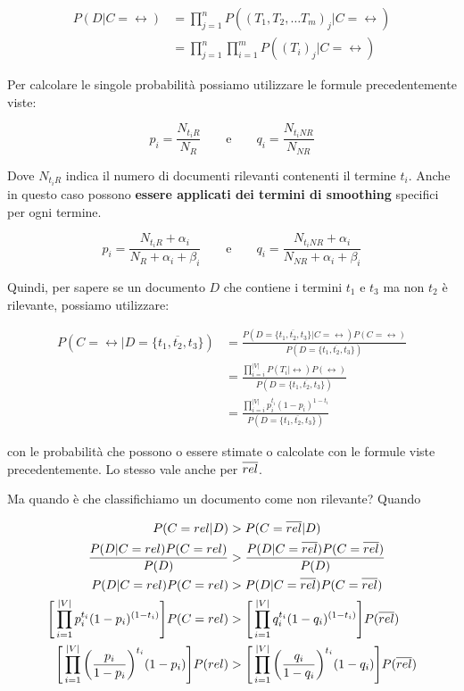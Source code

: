 \begin{align*}
P(D | C=\rel) &= \prod\limits_{j=1}^n P((T_{1},T_{2},\ldots T_{m})_j|C=\rel) \\
&= \prod\limits_{j=1}^n \prod\limits_{i=1}^m P((T_i)_j | C=\rel)
\end{align*}


\noindent Per calcolare le singole probabilità possiamo utilizzare le formule precedentemente viste:

$$
p_i = \frac{N_{t_iR}}{N_R} \qquad \text{e} \qquad q_i = \frac{N_{t_iNR}}{N_{NR}}
$$

\noindent Dove $N_{t_iR}$ indica il numero di documenti rilevanti contenenti il termine $t_i$. Anche in questo caso possono \textbf{essere applicati dei termini di smoothing} specifici per ogni termine.

$$
\boxed{p_i = \frac{N_{t_iR} + \alpha_i}{N_R + \alpha_i + \beta_i}} \qquad \text{e} \qquad \boxed{q_i = \frac{N_{t_iNR} + \alpha_i}{N_{NR} + \alpha_i + \beta_i}}
$$

Quindi, per sapere se un documento $D$ che contiene i termini $t_1$ e $t_3$ ma non $t_2$ è rilevante, possiamo utilizzare:

\begin{align*}
P(C=\rel | D=\{t_1, \overline{t_2}, t_3\}) &=\frac{ P( D=\{t_1, \overline{t_2}, t_3\} |C = \rel)P(C=\rel)}{P( D=\{t_1, \overline{t_2}, t_3\})} \\
                                           &=\frac{\prod\limits_{i=i}^{|V|} P(T_i | \rel)P(\rel) }{P( D=\{t_1, \overline{t_2}, t_3\})} \\
                                           &=\frac{\prod\limits_{i=i}^{|V|}p_{i}^{t_i}(1-p_i)^{1- t_i} }{P( D=\{t_1, \overline{t_2}, t_3\})}
\end{align*}

\noindent con le probabilità che possono o essere stimate o calcolate con le formule viste precedentemente. Lo stesso vale anche per $\overline{rel}$.

Ma quando è che classifichiamo un documento come non rilevante? Quando

\begin{align*}
									                        P(C=rel|D) &> P(C=\overline{rel} |D) \\
									\frac{P(D | C=rel)P(C=rel)}{P(D)} &> \frac{P(D | C=\overline{rel})P(C=\overline{rel})}{P(D)} \\
									             P(D | C=rel)P(C=rel) &> P(D | C=\overline{rel})P(C=\overline{rel}) \\
			\Bigg[\prod\limits_{i=1}^{|V|} p_{i}^{t_i} (1 - p_{i})^{(1-t_i)}\Bigg] P(C = rel) &> \Bigg[\prod\limits_{i=1}^{|V|} q_{i}^{t_i} (1 - q_{i})^{(1-t_i)}\Bigg]P(\overline{rel}) \\
  \Bigg[\prod\limits_{i=1}^{|V|} \bigg(\frac{ p_{i} }{1-p_i}\bigg)^{t_i} (1-p_i)\Bigg] P(rel) &>\Bigg[\prod\limits_{i=1}^{|V|} \bigg(\frac{ q_{i} }{1-q_i}\bigg)^{t_i} (1-q_i)\Bigg] P(\overline{rel})
\end{align*}

